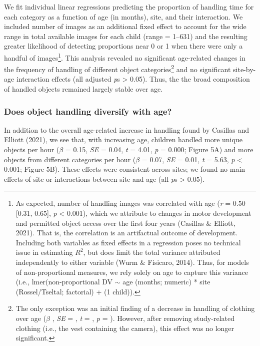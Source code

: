 \documentclass[10pt, letterpaper]{article}
\begin{document}
We fit individual linear regressions predicting the proportion of
handling time for each category as a function of age (in months), site,
and their interaction. We included number of images as an additional
fixed effect to account for the wide range in total available images for
each child (range = 1--631) and the resulting greater likelihood of
detecting proportions near 0 or 1 when there were only a handful of
images\footnote{As expected, number of handling images was correlated
  with age (\emph{r} = 0.50 {[}0.31, 0.65{]}, \emph{p} \textless{}
  0.001), which we attribute to changes in motor development and
  permitted object access over the first four years (Casillas \&
  Elliott, 2021). That is, the correlation is an artifactual outcome of
  development. Including both variables as fixed effects in a regression
  poses no technical issue in estimating \(R^{2}\), but does limit the
  total variance attributed independently to either variable (Wurm \&
  Fisicaro, 2014). Thus, for models of non-proportional measures, we
  rely solely on age to capture this variance (i.e.,
  lmer(non-proportional DV \({\sim}\) age (months; numeric) * site
  (Rossel/Tseltal; factorial) + (1 \textbar{} child)).}. This analysis
revealed no significant age-related changes in the frequency of handling
of different object categories\footnote{The only exception was an
  initial finding of a decrease in handling of clothing over age
  (\(\beta\) , \emph{SE} = , \emph{t} = , \emph{p} = ). However, after
  removing study-related clothing (i.e., the vest containing the
  camera), this effect was no longer significant.} and no significant
site-by-age interaction effects (all adjusted \emph{p}s \textgreater{}
0.05). Thus, the the broad composition of handled objects remained
largely stable over age. \newline

\hypertarget{does-object-handling-diversify-with-age}{%
\subsubsection{Does object handling diversify with
age?}\label{does-object-handling-diversify-with-age}}

In addition to the overall age-related increase in handling found by
Casillas and Elliott (2021), we see that, with increasing age, children
handled more unique objects per hour (\(\beta\) = 0.15, \emph{SE} =
0.04, \emph{t} = 4.01, \emph{p} = 0.000; Figure 5A) and more objects
from different categories per hour (\(\beta\) = 0.07, \emph{SE} = 0.01,
\emph{t} = 5.63, \emph{p} \textless{} 0.001; Figure 5B). These effects
were consistent across sites; we found no main effects of site or
interactions between site and age (all \emph{p}s \textgreater{}
0.05).\newline
\end{document}

